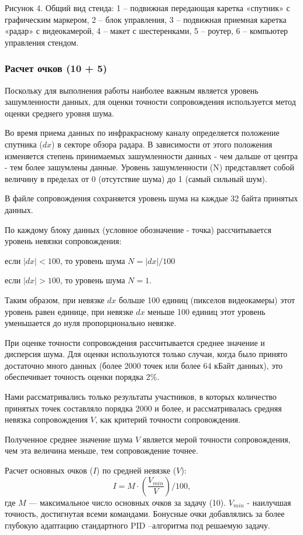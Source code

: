 
\begin{center}
    Рисунок 4. Общий вид стенда: 1 – подвижная передающая каретка «спутник» с графическим маркером, 2 – блок управления, 3 – подвижная приемная каретка «радар» с видеокамерой, 4 – макет с шестеренками, 5 – роутер, 6 – компьютер управления стендом.
\end{center}

\subsubsection*{Расчет очков (10 + 5)}

Поскольку для выполнения работы наиболее важным является уровень зашумленности данных, для оценки точности сопровождения используется метод оценки среднего уровня шума.

Во время приема данных по инфракрасному каналу определяется положение спутника ($dx$) в секторе обзора радара. В зависимости от этого положения изменяется степень принимаемых зашумленности данных - чем дальше от центра - тем более зашумлены данные. Уровень зашумленности (N) представляет собой величину в пределах от 0 (отсутствие шума) до 1 (самый сильный шум).

В файле сопровождения сохраняется уровень шума на каждые 32 байта принятых данных.

По каждому блоку данных (условное обозначение - точка) рассчитывается уровень невязки сопровождения:

	если $|dx|< 100$, то уровень шума $N=|dx|/100$

    если $|dx| > 100$, то уровень шума $N=1$.

Таким образом, при невязке $dx$ больше 100 единиц (пикселов видеокамеры) этот уровень равен единице, при невязке $dx$ меньше 100 единиц этот уровень уменьшается до нуля пропорционально невязке.

При оценке точности сопровождения рассчитывается среднее значение и дисперсия шума.  Для оценки используются только случаи, когда было принято достаточно много данных (более 2000 точек или более 64 кБайт данных), это обеспечивает точность оценки порядка 2\%.

Нами рассматривались только результаты участников, в которых количество принятых точек составляло порядка 2000 и более, и рассматривалась средняя невязка сопровождения $V$, как критерий точности сопровождения.

Полученное среднее значение шума $V$ является мерой точности сопровождения, чем эта величина меньше, тем сопровождение точнее.

Расчет основных очков ($I$) по средней невязке ($V$): 
$$I = M \cdot \left(\frac{V_{min}}{V}\right)/100,$$ 
где $M$ — максимальное число основных очков за задачу (10). $V_{min}$ - наилучшая точность, достигнутая всеми командами. Бонусные очки добавлялись за более глубокую адаптацию стандартного PID –алгоритма под решаемую задачу.
